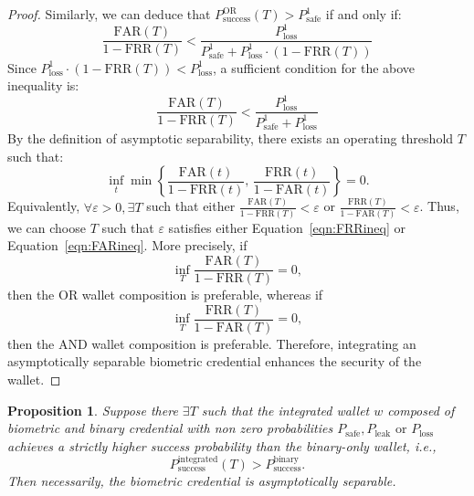 \documentclass[sigconf]{acmart}
\newtheorem{proposition}{Proposition}
\theoremstyle{definition}
\begin{document}
\begin{proof}
    Similarly, we can deduce that $P^{\text{OR}}_{\text{success}}(T) > P^1_{\text{safe}}$ if and only if:
    \[\frac{\mathrm{FAR}(T)}{1-\mathrm{FRR}(T)} < \frac{P^{1}_{\text{loss}}}{P^{1}_{\text{safe}}+P^{1}_{\text{loss}}\cdot(1-\mathrm{FRR}(T))}\]
    Since $P^{1}_{\text{loss}}\cdot(1-\mathrm{FRR}(T)) < P^{1}_{\text{loss}}$, a sufficient condition for the above inequality is:
    \begin{equation}
        \label{eqn:FARineq}
        \frac{\mathrm{FAR}(T)}{1-\mathrm{FRR}(T)} < \frac{P^{1}_{\text{loss}}}{P^{1}_{\text{safe}}+P^{1}_{\text{loss}}}
    \end{equation}
    By the definition of asymptotic separability, there exists an operating threshold $T$ such that: \[
    \inf_{t}
    \min\!\left\{
    \frac{\mathrm{FAR}(t)}{1-\mathrm{FRR}(t)},\,
    \frac{\mathrm{FRR}(t)}{1-\mathrm{FAR}(t)}
    \right\}
    = 0.
    \] 
    Equivalently, $\forall \varepsilon > 0, \exists T$ such that either $\frac{\mathrm{FAR}(T)}{1-\mathrm{FRR}(T)} < \varepsilon$ or $\frac{\mathrm{FRR}(T)}{1-\mathrm{FAR}(T)} < \varepsilon$. Thus, we can choose $T$ such that $\varepsilon$ satisfies either Equation~\ref{eqn:FRRineq} or Equation~\ref{eqn:FARineq}. More precisely, if \[\inf_{T}\frac{\mathrm{FAR}(T)}{1-\mathrm{FRR}(T)} = 0,\] 
    then the \textsc{OR} wallet composition is preferable, whereas if \[\inf_{T}\frac{\mathrm{FRR}(T)}{1-\mathrm{FAR}(T)} = 0,\] then the \textsc{AND} wallet composition is preferable. Therefore, integrating an asymptotically separable biometric credential enhances the security of the wallet.

\end{proof}

\begin{proposition}
Suppose there $\exists T$ such that the integrated wallet $w$ composed of biometric and binary credential with non zero probabilities $P_\text{safe}, P_\text{leak} \text{ or } P_\text{loss}$ achieves a strictly higher success probability than the binary-only wallet, i.e.,\[P^{\text{integrated}}_{\text{success}}(T) > P^{\text{binary}}_{\text{success}}.\] Then necessarily, the biometric credential is asymptotically separable.
\end{proposition} 
\end{document}
